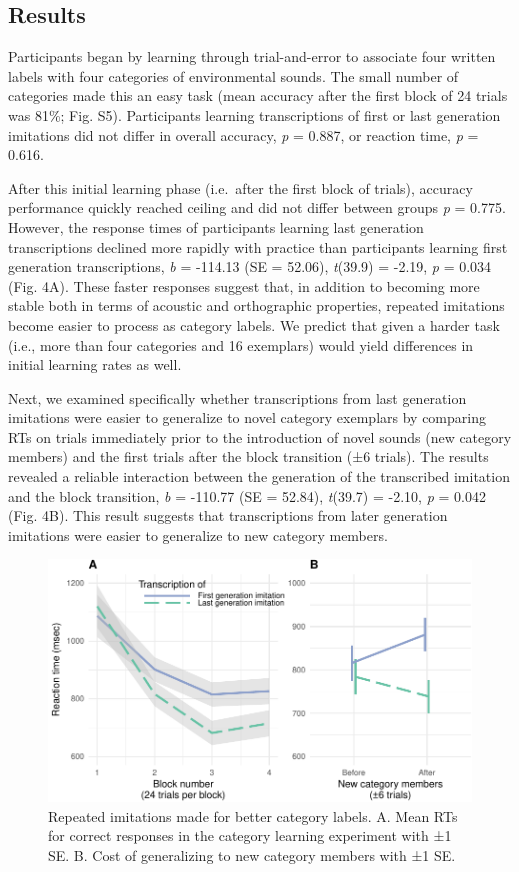 \documentclass[english,floatsintext,man]{apa6}
\theoremstyle{definition}
\theoremstyle{definition}
\theoremstyle{definition}
\theoremstyle{remark}
\begin{document}
\hypertarget{results-2}{%
\subsection{Results}\label{results-2}}

Participants began by learning through trial-and-error to associate four
written labels with four categories of environmental sounds. The small
number of categories made this an easy task (mean accuracy after the
first block of 24 trials was 81\%; Fig. S5). Participants learning
transcriptions of first or last generation imitations did not differ in
overall accuracy, \emph{p} = 0.887, or reaction time, \emph{p} = 0.616.

After this initial learning phase (i.e.~after the first block of
trials), accuracy performance quickly reached ceiling and did not differ
between groups \emph{p} = 0.775. However, the response times of
participants learning last generation transcriptions declined more
rapidly with practice than participants learning first generation
transcriptions, \emph{b} = -114.13 (SE = 52.06), \emph{t}(39.9) = -2.19,
\emph{p} = 0.034 (Fig. 4A). These faster responses suggest that, in
addition to becoming more stable both in terms of acoustic and
orthographic properties, repeated imitations become easier to process as
category labels. We predict that given a harder task (i.e., more than
four categories and 16 exemplars) would yield differences in initial
learning rates as well.

Next, we examined specifically whether transcriptions from last
generation imitations were easier to generalize to novel category
exemplars by comparing RTs on trials immediately prior to the
introduction of novel sounds (new category members) and the first trials
after the block transition (±6 trials). The results revealed a reliable
interaction between the generation of the transcribed imitation and the
block transition, \emph{b} = -110.77 (SE = 52.84), \emph{t}(39.7) =
-2.10, \emph{p} = 0.042 (Fig. 4B). This result suggests that
transcriptions from later generation imitations were easier to
generalize to new category members.

\begin{figure}
\centering
\includegraphics{fig4-1.pdf}
\caption{\label{fig:fig4}Repeated imitations made for better category
labels. A. Mean RTs for correct responses in the category learning
experiment with ±1 SE. B. Cost of generalizing to new category members
with ±1 SE.}
\end{figure}
\end{document}
